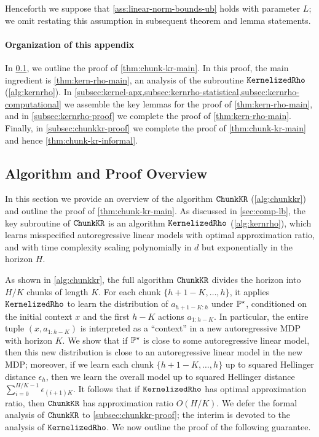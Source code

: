 Henceforth we suppose that \cref{ass:linear-norm-bounds-ub} holds with parameter $L$; we omit restating this assumption in subsequent theorem and lemma statements.

\paragraph{Organization of this appendix} In \cref{subsec:comp-ub-overview}, we outline the proof of \cref{thm:chunk-kr-main}. In this proof, the main ingredient is \cref{thm:kern-rho-main}, an analysis of the subroutine $\texttt{KernelizedRho}$ (\cref{alg:kernrho}). In \cref{subsec:kernel-apx,subsec:kernrho-statistical,subsec:kernrho-computational} we assemble the key lemmas for the proof of \cref{thm:kern-rho-main}, and in \cref{subsec:kernrho-proof} we complete the proof of \cref{thm:kern-rho-main}. Finally, in \cref{subsec:chunkkr-proof} we complete the proof of \cref{thm:chunk-kr-main} and hence \cref{thm:chunk-kr-informal}.

\subsection{Algorithm and Proof Overview}\label{subsec:comp-ub-overview}

In this section we provide an overview of the algorithm $\texttt{ChunkKR}$ (\cref{alg:chunkkr}) and outline the proof of \cref{thm:chunk-kr-main}. As discussed in \cref{sec:comp-lb}, the key subroutine of $\texttt{ChunkKR}$ is an algorithm $\texttt{KernelizedRho}$ (\cref{alg:kernrho}), which learns misspecified autoregressive linear models with optimal approximation ratio, and with time complexity scaling polynomially in $d$ but exponentially in the horizon $H$.

As shown in \cref{alg:chunkkr}, the full algorithm $\texttt{ChunkKR}$ divides the horizon into $H/K$ chunks of length $K$. For each chunk $\{h+1-K,\dots,h\}$, it applies $\texttt{KernelizedRho}$ to learn the distribution of $a_{h+1-K:h}$ under $\mathbb{P}^\star$, conditioned on the initial context $x$ and the first $h-K$ actions $a_{1:h-K}$. In particular, the entire tuple $(x, a_{1:h-K})$ is interpreted as a ``context'' in a new autoregressive MDP with horizon $K$. We show that if $\mathbb{P}^\star$ is close to some autoregressive linear model, then this new distribution is close to an autoregressive linear model in the new MDP; moreover, if we learn each chunk $\{h+1-K,\dots,h\}$ up to squared Hellinger distance $\epsilon_h$, then we learn the overall model up to squared Hellinger distance $\sum_{i=0}^{H/K-1} \epsilon_{(i+1)K}$. It follows that if $\texttt{KernelizedRho}$ has optimal approximation ratio, then $\texttt{ChunkKR}$ has approximation ratio $O(H/K)$. We defer the formal analysis of $\texttt{ChunkKR}$ to \cref{subsec:chunkkr-proof}; the interim is devoted to the analysis of $\texttt{KernelizedRho}$. We now outline the proof of the following guarantee.

